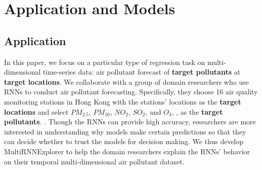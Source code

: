 \section{Application and Models}
\subsection{Application}
\label{section:application}
In this paper, we focus on a particular type of regression task on multi-dimensional time-series data: air pollutant forecast of \textbf{target pollutants} at \textbf{target locations}.
We collaborate with a group of domain researchers who use RNNs to conduct air pollutant forecasting.
Specifically, they choose 16 air quality monitoring stations in Hong Kong with the stations' locations as the \textbf{target locations} and select $PM_{2.5}$, $PM_{10}$, $NO_{2}$, $SO_{2}$, and $O_3$, , as the \textbf{target pollutants}. .
Though the RNNs can provide high accuracy, researchers are more interested in understanding why models make certain predictions so that they can decide whether to trust the models for decision making.
We thus develop MultiRNNExplorer to help the domain researchers explain the RNNs' behavior on their temporal multi-dimensional air pollutant dataset.





